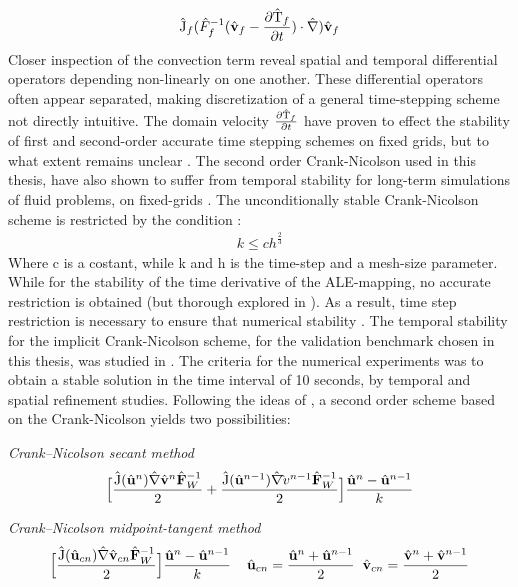 \begin{align}
\text{\^{J}}_f (\hat{F}_f^{-1}(\hat{\mathbf{v}}_f - \frac{\partial \text{\^{T}}_f}{\partial t}) \cdot \hat{\nabla}) \hat{\mathbf{v}}_f
\end{align} 
Closer inspection of the convection term reveal spatial and temporal differential operators depending non-linearly on one another. These differential operators often appear separated, making discretization of a general time-stepping scheme not directly intuitive. The domain velocity $ \frac{\partial \text{\^{T}}_f}{\partial t}$ have proven to effect the stability of first and second-order accurate time stepping schemes on fixed grids, but to what extent remains unclear  \cite{Formaggia2004, Formaggia1991}. The second order Crank-Nicolson used in this thesis, have also shown to suffer from temporal stability for long-term simulations of fluid problems, on fixed-grids \cite{Wick2013a}.
The  unconditionally stable Crank-Nicolson scheme is restricted by the condition \cite{Wick2013a}:
\begin{align}
k \leq ch^{\frac{2}{3}} 
\end{align}
Where c is a costant, while k and h is the time-step and a mesh-size parameter. While for the stability of the time derivative of the ALE-mapping, no accurate restriction is obtained (but thorough explored in \cite{Formaggia2004}). As a result, time step restriction is necessary to ensure that numerical stability  \cite{Formaggia2004}. The temporal stability for the implicit Crank-Nicolson scheme, for the validation benchmark chosen in this thesis, was studied in  \cite{Richter2015}. The criteria for the numerical experiments was to obtain a stable solution in the time interval of 10 seconds, by temporal and spatial refinement studies.  Following the ideas of \cite{Richter2015}, a second order scheme based on the Crank-Nicolson yields two possibilities:

\begin{discr}
\textit{Crank–Nicolson secant method }
\begin{align*}
\Big[\frac{\text{\^{J}}(\hat{\mathbf{u}}^{n}) \hat{\mathbf{\nabla}} \hat{\mathbf{v}}^{n} \hat{\mathbf{F}}_W^{-1}}{2} 
+ \frac{\text{\^{J}}(\hat{\mathbf{u}}^{n-1}) \hat{\mathbf{\nabla}} \hat{\mathbf{}}v^{n-1} \hat{\mathbf{F}}_W^{-1}}{2} \Big] 
\frac{\hat{\mathbf{u}}^{n} - \hat{\mathbf{u}}^{n-1}}{k}
\end{align*} 
\label{eq:cn1}
\end{discr}

\begin{discr}
\textit{Crank–Nicolson midpoint-tangent method}
\begin{align*}
\Big[\frac{\text{\^{J}}(\hat{\mathbf{u}}_{cn}) \hat{\mathbf{\nabla}} \hat{\mathbf{v}}_{cn} \hat{\mathbf{F}}_W^{-1}}{2} \Big] 
\frac{\hat{\mathbf{u}}^{n} - \hat{\mathbf{u}}^{n-1}}{k} \hspace{4mm}
\hat{\mathbf{u}}_{cn} = \frac{\hat{\mathbf{u}}^{n} + \hat{\mathbf{u}}^{n-1}}{2} \hspace{2mm}
\hat{\mathbf{v}}_{cn} = \frac{\hat{\mathbf{v}}^{n} + \hat{\mathbf{v}}^{n-1}}{2}
\end{align*} 
\label{eq:cn2}
\end{discr}

